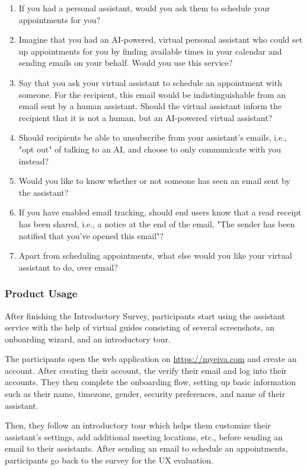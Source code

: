 \documentclass{article}
\begin{document}
\begin{enumerate}[resume]
	\item If you had a personal assistant, would you ask them to schedule your appointments for you?
	\item Imagine that you had an AI-powered, virtual personal assistant who could set up appointments for you by finding available times in your calendar and sending emails on your behalf. Would you use this service?
	\item Say that you ask your virtual assistant to schedule an appointment with someone. For the recipient, this email would be indistinguishable from an email sent by a human assistant. Should the virtual assistant inform the recipient that it is not a human, but an AI-powered virtual assistant?
	\item Should recipients be able to unsubscribe from your assistant's emails, i.e., "opt out" of talking to an AI, and choose to only communicate with you instead?
	\item Would you like to know whether or not someone has seen an email sent by the assistant?
	\item If you have enabled email tracking, should end users know that a read receipt has been shared, i.e., a notice at the end of the email, "The sender has been notified that you've opened this email"?
	\item Apart from scheduling appointments, what else would you like your virtual assistant to do, over email?
\end{enumerate}

\subsubsection{Product Usage}

After finishing the Introductory Survey, participants start using the assistant service with the help of virtual guides consisting of several screenshots, an onboarding wizard, and an introductory tour.

The participants open the web application on \url{https://myeiva.com} and create an account. After creating their account, the verify their email and log into their accounts. They then complete the onboarding flow, setting up basic information such as their name, timezone, gender, security preferences, and name of their assistant.

Then, they follow an introductory tour which helps them customize their assistant's settings, add additional meeting locations, etc., before sending an email to their assistants. After sending an email to schedule an appointments, participants go back to the survey for the UX evaluation.
\end{document}
